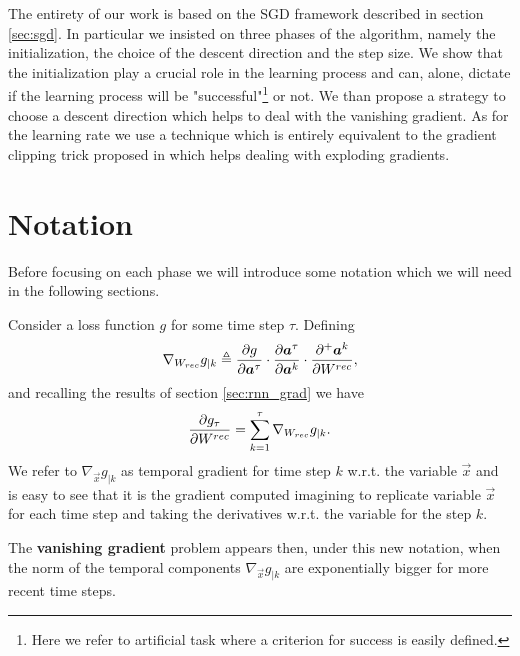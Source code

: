 The entirety of our work is based on the SGD framework described in section \ref{sec:sgd}. In particular we insisted on three phases of the algorithm, namely the initialization, the choice of the descent direction and the step size. We show that the initialization play a crucial role in the learning process and can, alone, dictate if the learning process will be "successful"\footnote{Here we refer to artificial task where a criterion for success is easily defined.} or not. We than propose a strategy to choose a descent direction which helps to deal with the vanishing gradient. As for the learning rate we use a technique which is entirely equivalent to the gradient clipping trick proposed in \cite{understandingExplodingGradients} which helps dealing with exploding gradients.

\section{Notation}
Before focusing on each phase we will introduce some notation which we will need in the following sections.

Consider a loss function $g$ for some time step $\tau$. Defining 
\begin{equation}
\nabla_{W_{rec}} g_{|k}  \triangleq \frac{\partial g}{\partial \boldsymbol{a}^{\tau}} \cdot \frac{\partial \boldsymbol{a}^{\tau}}{\partial \boldsymbol{a}^k} \cdot \frac{\partial^+ \boldsymbol{a}^k}{\partial W^{rec}},
\end{equation}
and recalling the results of section \ref{sec:rnn_grad} we have
\begin{equation}
	\frac{\partial g_{\tau}}{\partial W^{rec}} = \sum_{k=1}^{\tau} \nabla_{W_{rec}} g_{|k}.
\end{equation}
We refer to $\nabla_{\vec{x}} g_{|k}$ as temporal gradient for time step $k$ w.r.t. the variable $\vec{x}$ and is easy to see that it is the gradient computed imagining to replicate variable $\vec{x}$ for each time step and taking the derivatives w.r.t. the variable for the step $k$.

The \textbf{vanishing gradient} problem appears then, under this new notation, when the norm of the temporal components $\nabla_{\vec{x}} g_{|k}$ are exponentially bigger for more recent time steps.

